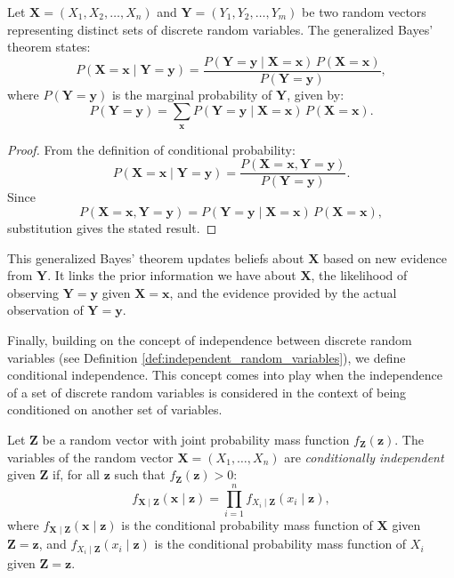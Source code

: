 \begin{theorem}
Let $\mathbf{X} = (X_1, X_2, \ldots, X_n)$ and $\mathbf{Y} = (Y_1, Y_2, \ldots, Y_m)$ be two random vectors representing distinct sets of discrete random variables. The generalized Bayes' theorem states:
\[
P(\mathbf{X} = \mathbf{x} \mid \mathbf{Y} = \mathbf{y}) = \frac{P(\mathbf{Y} = \mathbf{y} \mid \mathbf{X} = \mathbf{x}) \, P(\mathbf{X} = \mathbf{x})}{P(\mathbf{Y} = \mathbf{y})},
\]
where $P(\mathbf{Y} = \mathbf{y})$ is the marginal probability of $\mathbf{Y}$, given by:
\[
P(\mathbf{Y} = \mathbf{y}) = \sum_{\mathbf{x}} P(\mathbf{Y} = \mathbf{y} \mid \mathbf{X} = \mathbf{x}) \, P(\mathbf{X} = \mathbf{x}).
\]
\end{theorem}
\begin{proof}
From the definition of conditional probability:
\[
P(\mathbf{X} = \mathbf{x} \mid \mathbf{Y} = \mathbf{y}) = \frac{P(\mathbf{X} = \mathbf{x}, \mathbf{Y} = \mathbf{y})}{P(\mathbf{Y} = \mathbf{y})}.
\]
Since
\[
P(\mathbf{X} = \mathbf{x}, \mathbf{Y} = \mathbf{y}) = P(\mathbf{Y} = \mathbf{y} \mid \mathbf{X} = \mathbf{x}) \, P(\mathbf{X} = \mathbf{x}),
\]
substitution gives the stated result.
\end{proof}

This generalized Bayes' theorem updates beliefs about $\mathbf{X}$ based on new evidence from $\mathbf{Y}$. It links the prior information we have about \( \mathbf{X} \), the likelihood of observing \( \mathbf{Y} = \mathbf{y} \) given \( \mathbf{X} = \mathbf{x} \), and the evidence provided by the actual observation of \( \mathbf{Y} = \mathbf{y} \).

Finally, building on the concept of independence between discrete random variables (see Definition \ref{def:independent_random_variables}), we define conditional independence. This concept comes into play when the independence of a set of discrete random variables is considered in the context of being conditioned on another set of variables.

\begin{definition}
Let \( \mathbf{Z} \) be a random vector with joint probability mass function \( f_{\mathbf{Z}}(\mathbf{z}) \). The variables of the random vector \( \mathbf{X} = (X_{1}, \ldots, X_{n}) \) are \emph{conditionally independent} given \( \mathbf{Z} \) if, for all \( \mathbf{z} \) such that \( f_{\mathbf{Z}}(\mathbf{z}) > 0 \):
\[
f_{\mathbf{X} \mid \mathbf{Z}} (\mathbf{x} \mid \mathbf{z}) = \prod_{i=1}^{n} f_{X_i \mid \mathbf{Z}}(x_{i} \mid \mathbf{z}),
\]
where \( f_{\mathbf{X} \mid \mathbf{Z}}(\mathbf{x} \mid \mathbf{z}) \) is the conditional probability mass function of \( \mathbf{X} \) given \( \mathbf{Z} = \mathbf{z} \), and \( f_{X_i \mid \mathbf{Z}}(x_{i} \mid \mathbf{z}) \) is the conditional probability mass function of \( X_{i} \) given \( \mathbf{Z} = \mathbf{z} \).
\end{definition}

